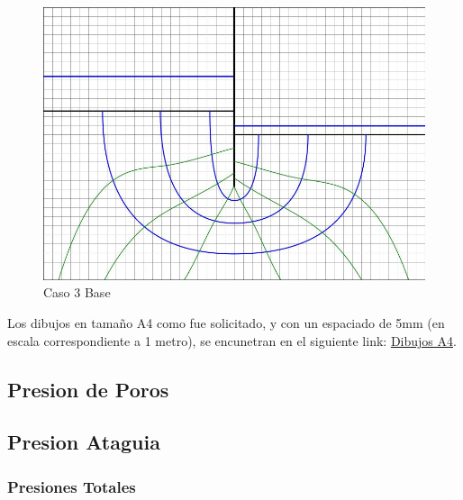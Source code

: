 \documentclass{article}
\begin{document}
\begin{figure}[H]
\begin{minipage}{0.32\textwidth}
      \includegraphics[width=\textwidth]{FOTOS/caso_3dibujo_base.jpg}
      \caption{Caso 3 Base}
  \end{minipage}
\end{figure}

Los dibujos en tamaño A4 como fue solicitado, y con un espaciado de 5mm (en escala correspondiente a 1 metro), se encunetran en
el siguiente link: \href{https://github.com/LukasWolff2002/PROYECTO_1_MCOCo}{Dibujos A4}.

\subsection{Presion de Poros}

\subsection{Presion Ataguia}

\subsubsection{Presiones Totales}
\end{document}
